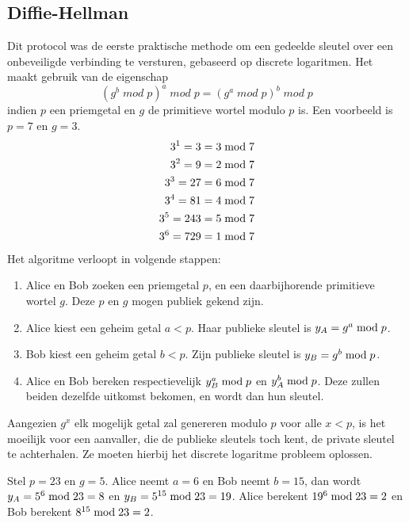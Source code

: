 \documentclass{report}
\begin{document}
	\subsection{Diffie-Hellman}
	Dit protocol was de eerste praktische methode om een gedeelde sleutel over een onbeveiligde verbinding te versturen, gebaseerd op discrete logaritmen. Het maakt gebruik van de eigenschap
	$$(g^b\;mod\;p)^a\;mod\;p = (g^a\;mod\;p)^b\;mod\;p$$ indien $p$ een priemgetal en $g$ de primitieve wortel modulo $p$ is. Een voorbeeld is $p = 7$ en $g = 3$. 
	\begin{equation*}
		\begin{split}
			3^1 = 3 & = 3\;\hbox{mod}\;7\\
			3^2 = 9 & = 2\;\hbox{mod}\;7\\
			3^3 = 27 & = 6\;\hbox{mod}\;7\\
			3^4 = 81 &  = 4\;\hbox{mod}\;7\\
			3^5 = 243  & = 5\;\hbox{mod}\;7\\
			3^6 = 729  & = 1\;\hbox{mod}\;7\\
		\end{split}
	\end{equation*}
	Het algoritme verloopt in volgende stappen:
	\begin{enumerate}
		\item Alice en Bob zoeken een priemgetal $p$, en een daarbijhorende primitieve wortel $g$. Deze $p$ en $g$ mogen publiek gekend zijn.
		\item Alice kiest een geheim getal $a < p$. Haar publieke sleutel is $y_A = g^a\;\hbox{mod}\;p$.
		\item Bob kiest een geheim getal $b < p$. Zijn publieke sleutel is $y_B = g^b\;\hbox{mod}\;p$.
		\item Alice en Bob bereken respectievelijk $y_B^a\;\hbox{mod}\;p$ en $y_A^b\;\hbox{mod}\;p$. Deze zullen beiden dezelfde uitkomst bekomen, en wordt dan hun sleutel. 
	\end{enumerate}
	 Aangezien $g^x$ elk mogelijk getal zal genereren modulo $p$ voor alle $x < p$, is het moeilijk voor een aanvaller, die de publieke sleutels toch kent, de private sleutel te achterhalen. Ze moeten hierbij het discrete logaritme probleem oplossen. 
	 
	 Stel $p = 23$ en $g = 5$. Alice neemt $a = 6$ en Bob neemt $b = 15$, dan wordt $y_A = 5^6\;\hbox{mod}\;23 = 8$ en $y_B = 5^{15}\;\hbox{mod}\;23 = 19$. Alice berekent $19^6\;\hbox{mod}\;23 = 2$ en Bob berekent  $8^{15}\;\hbox{mod}\;23 = 2$.
\end{document}
